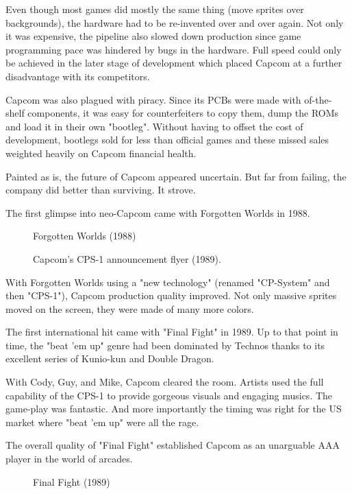 Even though most games did mostly the same thing (move sprites over backgrounds), the hardware had to be re-invented over and over again. Not only it was expensive, the pipeline also slowed down production since game programming pace was hindered by bugs in the hardware. Full speed could only be achieved in the later stage of development which placed Capcom at a further disadvantage with its competitors.

Capcom was also plagued with piracy. Since its PCBs were made with of-the-shelf components, it was easy for counterfeiters to copy them, dump the ROMs and load it in their own "bootleg". Without having to offset the cost of development, bootlegs sold for less than official games and these missed sales weighted heavily on Capcom financial health.


Painted as is, the future of Capcom appeared uncertain. But far from failing, the company did better than surviving. It strove.

 The first glimpse into neo-Capcom came with Forgotten Worlds in 1988.

 \begin{figure}[H]
\caption*{Forgotten Worlds (1988)}
\end{figure}

  \begin{figure}[H]
  \caption*{Capcom's CPS-1 announcement flyer (1989).}
  \end{figure}

 With Forgotten Worlds using a "new technology" (renamed "CP-System" and then "CPS-1"), Capcom production quality improved. Not only massive sprites moved on the screen, they were made of many more colors.

The first international hit came with "Final Fight" in 1989. Up to that point in time, the "beat 'em up" genre had been dominated by Technos thanks to its excellent series of Kunio-kun and Double Dragon. 

With Cody, Guy, and Mike, Capcom cleared the room. Artists used the full capability of the CPS-1 to provide gorgeous visuals and engaging musics. The game-play was fantastic. And more importantly the timing was right for the US market where "beat 'em up" were all the rage.

 
The overall quality of "Final Fight" established Capcom as an unarguable AAA player in the world of arcades.

  

\label{nin_ff}
 \begin{figure}[H]
\caption*{Final Fight (1989)}
\end{figure}

